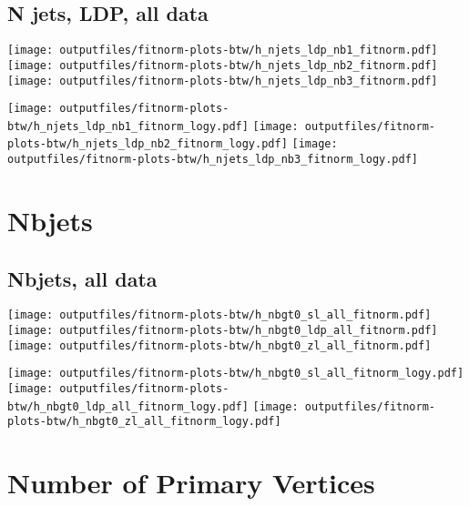 \documentclass[11pt]{article}
\begin{document}
    \subsection{ N jets, LDP, all data}

    \noindent
     \texttt{[image: outputfiles/fitnorm-plots-btw/h\_njets\_ldp\_nb1\_fitnorm.pdf]}
     \texttt{[image: outputfiles/fitnorm-plots-btw/h\_njets\_ldp\_nb2\_fitnorm.pdf]}
     \texttt{[image: outputfiles/fitnorm-plots-btw/h\_njets\_ldp\_nb3\_fitnorm.pdf]}

    \noindent
     \texttt{[image: outputfiles/fitnorm-plots-btw/h\_njets\_ldp\_nb1\_fitnorm\_logy.pdf]}
     \texttt{[image: outputfiles/fitnorm-plots-btw/h\_njets\_ldp\_nb2\_fitnorm\_logy.pdf]}
     \texttt{[image: outputfiles/fitnorm-plots-btw/h\_njets\_ldp\_nb3\_fitnorm\_logy.pdf]}

   \clearpage




    \clearpage
    \section{Nbjets}

    \subsection{ Nbjets, all data}

    \noindent
     \texttt{[image: outputfiles/fitnorm-plots-btw/h\_nbgt0\_sl\_all\_fitnorm.pdf]}
     \texttt{[image: outputfiles/fitnorm-plots-btw/h\_nbgt0\_ldp\_all\_fitnorm.pdf]}
     \texttt{[image: outputfiles/fitnorm-plots-btw/h\_nbgt0\_zl\_all\_fitnorm.pdf]}

    \noindent
     \texttt{[image: outputfiles/fitnorm-plots-btw/h\_nbgt0\_sl\_all\_fitnorm\_logy.pdf]}
     \texttt{[image: outputfiles/fitnorm-plots-btw/h\_nbgt0\_ldp\_all\_fitnorm\_logy.pdf]}
     \texttt{[image: outputfiles/fitnorm-plots-btw/h\_nbgt0\_zl\_all\_fitnorm\_logy.pdf]}







    \section{Number of Primary Vertices }
\end{document}
